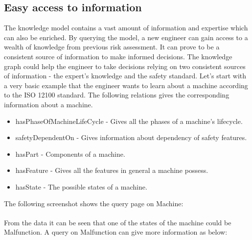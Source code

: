 \subsection{Easy access to information}
The knowledge model contains a vast amount of information and expertise which can also be enriched. By querying the model, a new engineer can gain access to a wealth of knowledge from previous risk assessment. It can prove to be a consistent source of information to make informed decisions. The knowledge graph could help the engineer to take decisions relying on two consistent sources of information - the expert's knowledge and the safety standard. Let's start with a very basic example that the engineer wants to learn about a machine according to the ISO 12100 standard. The following relations gives the corresponding information about a machine.
\begin{itemize}
    \item hasPhaseOfMachineLifeCycle - Gives all the phases of a machine's lifecycle.
    \item safetyDependentOn - Gives information about dependency of safety features.
    \item hasPart - Components of a machine.
    \item hasFeature - Gives all the features in general a machine possess.
    \item hasState - The possible states of a machine.
\end{itemize}

The following screenshot shows the query page on Machine:


\bigskip\bigskip {}

\paragraph{} From the data it can be seen that one of the states of the machine could be Malfunction. A query on Malfunction can give more information as below:


\bigskip\bigskip {}


